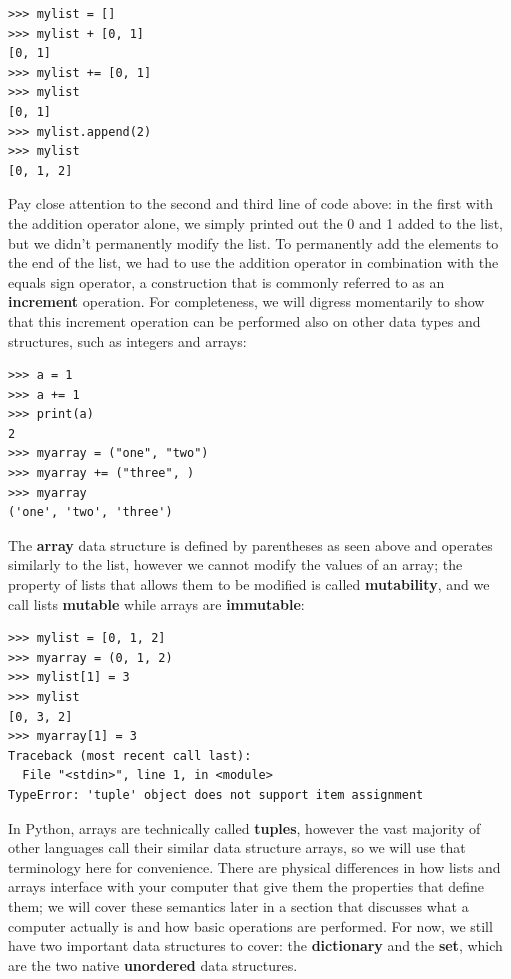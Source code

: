\documentclass[a4paper,11pt]{article}
\begin{document}
\vspace{3mm}
\begin{lstlisting}
>>> mylist = []
>>> mylist + [0, 1]
[0, 1]
>>> mylist += [0, 1]
>>> mylist
[0, 1]
>>> mylist.append(2)
>>> mylist
[0, 1, 2]
\end{lstlisting}
\vspace{3mm}

Pay close attention to the second and third line of code above: in the first with the addition operator alone, 
we simply printed out the 0 and 1 added to the list, but we didn't permanently modify the list.  
To permanently add the elements to the end of the list, we had to use the addition operator in combination with 
the equals sign operator, a construction that is commonly referred to as an \textbf{increment} operation.  For 
completeness, we will digress momentarily to show that this increment operation can be performed also on other 
data types and structures, such as integers and arrays:

\vspace{3mm}
\begin{lstlisting}
>>> a = 1
>>> a += 1
>>> print(a)
2
>>> myarray = ("one", "two")
>>> myarray += ("three", )
>>> myarray
('one', 'two', 'three')
\end{lstlisting}
\vspace{3mm}

The \textbf{array} data structure is defined by parentheses as seen above and operates similarly to the list, 
however we cannot modify 
the values of an array; the property of lists that allows them to be modified is called \textbf{mutability}, 
and we call lists \textbf{mutable} while arrays are \textbf{immutable}:

\vspace{3mm}
\begin{lstlisting}
>>> mylist = [0, 1, 2]
>>> myarray = (0, 1, 2)
>>> mylist[1] = 3
>>> mylist
[0, 3, 2]
>>> myarray[1] = 3
Traceback (most recent call last):
  File "<stdin>", line 1, in <module>
TypeError: 'tuple' object does not support item assignment
\end{lstlisting}
\vspace{3mm}

In Python, arrays are technically called \textbf{tuples}, however the vast majority of other languages 
call their similar data structure arrays, so we will use that terminology here for convenience.  There 
are physical differences in how lists and arrays interface with your computer that give them the 
properties that define them; we will cover these semantics later in a section that discusses what 
a computer actually is and how basic operations are performed.  For now, we still have two important 
data structures to cover: the \textbf{dictionary} and the \textbf{set}, which are the two native 
\textbf{unordered} data structures. \par
\end{document}
